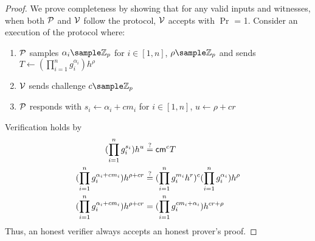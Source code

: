 \begin{proof}
    We prove completeness by showing that for any valid inputs and witnesses, when both $\mathcal{P}$ and $\mathcal{V}$ follow the protocol, $\mathcal{V}$ accepts with $\Pr$ = 1.
    Consider an execution of the protocol where:
    \begin{enumerate}
        \item $\mathcal{P}$ samples $\alpha_i \sample \Z_p$ for $i \in [1,n]$, $\rho \sample \Z_p$ and sends $T \gets (\prod_{i=1}^n g_i^{\alpha_i})h^{\rho}$
        \item $\mathcal{V}$ sends challenge $c \sample \Z_p$
        \item $\mathcal{P}$ responds with $s_i \gets \alpha_i + cm_i$ for $i \in [1,n]$, $u \gets \rho + cr$
    \end{enumerate}
    Verification holds by 
    \begin{align}
        (\prod_{i=1}^n g_i^{s_i})h^u &\stackrel{?}{=} \mathsf{cm}^cT \notag \\
        (\prod_{i=1}^n g_i^{\alpha_i + cm_i})h^{\rho + cr} &\stackrel{?}{=} (\prod_{i=1}^n g_i^{m_i}h^r)^c(\prod_{i=1}^n g_i^{\alpha_i})h^{\rho} \notag  \\
        (\prod_{i=1}^n g_i^{\alpha_i + cm_i})h^{\rho + cr} &= (\prod_{i=1}^n g_i^{cm_i + \alpha_i})h^{cr + \rho} \notag 
    \end{align}
    Thus, an honest verifier always accepts an honest prover's proof.
\end{proof}




